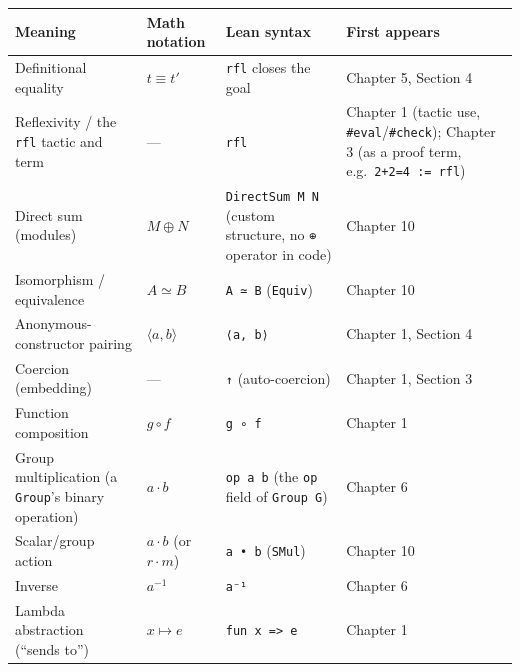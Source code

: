 \begin{longtable}[]{@{}
  >{\raggedright\arraybackslash}p{}
  >{\raggedright\arraybackslash}p{}
  >{\raggedright\arraybackslash}p{}
  >{\raggedright\arraybackslash}p{}@{}}
\toprule\noalign{}
\begin{minipage}[b]{\linewidth}\raggedright
Meaning
\end{minipage} & \begin{minipage}[b]{\linewidth}\raggedright
Math notation
\end{minipage} & \begin{minipage}[b]{\linewidth}\raggedright
Lean syntax
\end{minipage} & \begin{minipage}[b]{\linewidth}\raggedright
First appears
\end{minipage} \\
\midrule\noalign{}
\endhead
\bottomrule\noalign{}
\endlastfoot
Definitional equality & \(t \equiv t'\) & \texttt{rfl} closes the goal & Chapter 5, Section 4 \\
Reflexivity / the \texttt{rfl} tactic and term & --- & \texttt{rfl} & Chapter 1 (tactic use, \texttt{\#eval}/\texttt{\#check}); Chapter 3 (as a proof term, e.g.~\texttt{2+2=4 := rfl}) \\
Direct sum (modules) & \(M \oplus N\) & \texttt{DirectSum M N} (custom structure, no \texttt{⊕} operator in code) & Chapter 10 \\
Isomorphism / equivalence & \(A \simeq B\) & \texttt{A ≃ B} (\texttt{Equiv}) & Chapter 10 \\
Anonymous-constructor pairing & \(\langle a, b \rangle\) & \texttt{⟨a, b⟩} & Chapter 1, Section 4 \\
Coercion (embedding) & --- & \texttt{↑} (auto-coercion) & Chapter 1, Section 3 \\
Function composition & \(g \circ f\) & \texttt{g ∘ f} & Chapter 1 \\
Group multiplication (a \texttt{Group}'s binary operation) & \(a \cdot b\) & \texttt{op a b} (the \texttt{op} field of \texttt{Group G}) & Chapter 6 \\
Scalar/group action & \(a \cdot b\) (or \(r \cdot m\)) & \texttt{a • b} (\texttt{SMul}) & Chapter 10 \\
Inverse & \(a^{-1}\) & \texttt{a⁻¹} & Chapter 6 \\
Lambda abstraction (``sends to'') & \(x \mapsto e\) & \texttt{fun x => e} & Chapter 1 \\

\end{longtable}
